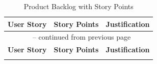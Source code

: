 \documentclass[12pt,a4paper]{article}
\begin{document}
\clearpage %
\small %
\begin{longtable}{|p{}|c|p{}|}
\caption{Product Backlog with Story Points}
\label{tab:backlog} \\
\hline %
\textbf{User Story} & \textbf{Story Points} & \textbf{Justification} \\
\hline
\endfirsthead

\multicolumn{3}{c}{{\tablename\ \thetable{} -- continued from previous page}} \\
\hline
\textbf{User Story} & \textbf{Story Points} & \textbf{Justification} \\
\hline
\endhead

\hline
\endfoot

\hline
\endlastfoot


\end{longtable}
\end{document}

